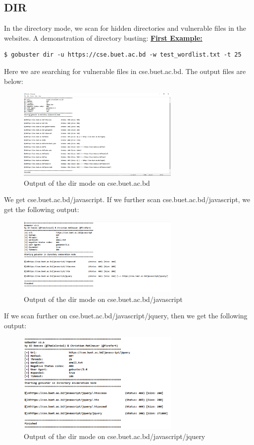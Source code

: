 \documentclass[12 pt]{article}
\begin{document}
\subsection{DIR}
In the directory mode, we scan for hidden directories and vulnerable files in the websites. A demonstration of directory busting:
\textbf{\underline{First Example:}}
\begin{lstlisting}
$ gobuster dir -u https://cse.buet.ac.bd -w test_wordlist.txt -t 25 
\end{lstlisting}
Here we are searching for vulnerable files in cse.buet.ac.bd.
The output files are below:
\begin{figure}[H]
    \centering
    \includegraphics[width=0.7\textwidth]{dir_1.png}
    \caption{Output of the dir mode on cse.buet.ac.bd}
    \label{fig: dir Output}
\end{figure}
We get cse.buet.ac.bd/javascript. If we further scan cse.buet.ac.bd/javascript, we get the following output:
\begin{figure}[H]
    \centering
    \includegraphics[width=0.7\textwidth]{dir_2.png}
    \caption{Output of the dir mode on cse.buet.ac.bd/javascript}
    \label{fig: dir2 Output}
\end{figure}
If we scan further on cse.buet.ac.bd/javascript/jquery, then we get the following output:
\begin{figure}[H]
    \centering
    \includegraphics[width=0.7\textwidth]{dir_3.png}
    \caption{Output of the dir mode on cse.buet.ac.bd/javascript/jquery}
    \label{fig: dir3 Output}
\end{figure}
\end{document}
